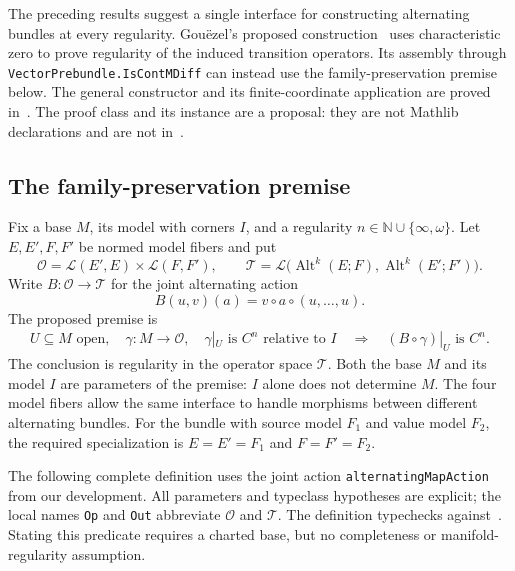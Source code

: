 \documentclass[11pt]{amsart}
\theoremstyle{definition}
\theoremstyle{remark}
\numberwithin{equation}{section}
\newcommand{\N}{\mathbb N}
\newcommand{\cL}{\mathcal L}
\newcommand{\Alt}{\operatorname{Alt}}
\begin{document}
The preceding results suggest a single interface for constructing alternating bundles at every
regularity. Gou\"ezel's proposed construction~\cite{G2} uses characteristic zero
to prove regularity of the induced transition operators. Its assembly through
\texttt{VectorPrebundle.\allowbreak IsContMDiff} can instead use the family-preservation premise below.
The general constructor and its finite-coordinate application are proved in~\cite{LeanP}. The proof class and its instance are a proposal: they are not Mathlib
declarations and are not in~\cite{LeanP}.

\subsection{The family-preservation premise}

Fix a base $M$, its model with corners $I$, and a regularity $n\in\N\cup\{\infty,\omega\}$.
Let $E,E',F,F'$ be normed model fibers and put
\[
 \mathcal O=\cL(E',E)\times\cL(F,F'),\qquad
 \mathcal T=\cL\bigl(\Alt^k(E;F),\Alt^k(E';F')\bigr).
\]
Write $B\colon\mathcal O\to\mathcal T$ for the joint alternating action
\[
 B(u,v)(a)=v\circ a\circ(u,\ldots,u).
\]
The proposed premise is
\begin{equation}\label{eq:mathlib-family-premise}
 \begin{gathered}
 U\subseteq M\text{ open},\quad \gamma\colon M\to\mathcal O,\quad
 \gamma|_U\text{ is }C^n\text{ relative to }I\quad\Longrightarrow\quad
 (B\circ\gamma)|_U\text{ is }C^n.
 \end{gathered}
\end{equation}
The conclusion is regularity in the operator space $\mathcal T$.
Both the base $M$ and its model $I$ are parameters of the premise: $I$ alone does not determine $M$.
The four model fibers allow the same interface to handle morphisms between different alternating
bundles. For the bundle with source model $F_1$ and value model $F_2$, the required specialization is
$E=E'=F_1$ and $F=F'=F_2$.

The following complete definition uses the joint action \texttt{alternatingMapAction} from our
development. All parameters and typeclass hypotheses are explicit; the local names \texttt{Op}
and \texttt{Out} abbreviate $\mathcal O$ and $\mathcal T$. The definition typechecks against~\cite{LeanP}. Stating this predicate requires a charted base, but no completeness or
manifold-regularity assumption.
\end{document}
